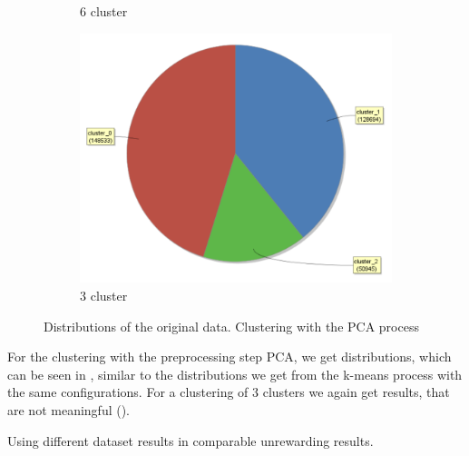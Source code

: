 \begin{figure}[H]
\begin{subfigure}{.3\textwidth}
  \caption{6 cluster}
  \label{fig:PCAOrgCl}
\end{subfigure}
\begin{subfigure}{.3\textwidth}
  \centering
  \includegraphics[width=.9\linewidth]{ClusterPCAOrigRapidCluster2Cluster.PNG}
  \caption{3 cluster}
  \label{fig:PCAOrgCl3}
\end{subfigure}
\caption{Distributions of the original data. Clustering with the PCA process}
\label{fig:PCAOrgDist}
\vspace*{-2em}
\end{figure}

For the clustering with the preprocessing step PCA, we get distributions, which can be seen in , similar to the distributions we get from the k-means process with the same configurations. 
For a clustering of 3 clusters we again get results, that are not meaningful ().


Using different dataset results in comparable unrewarding results.
\vspace*{-2em}